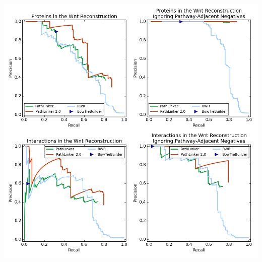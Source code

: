 \documentclass[10pt,letterpaper,twocolumn,twoside]{article}
\begin{document}
\vfill
\newpage
\pagebreak
\clearpage

\includegraphics[width=\textwidth]{../midterm_presentation/midterm_results}
\end{document}
